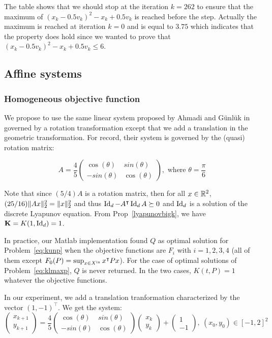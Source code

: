 \documentclass[10pt]{llncs}
\begin{document}
The table shows that we should stop at the iteration $k=262$ to ensure that the maximum of $(x_k-0.5 v_k)^2-x_k+0.5 v_k$ is reached before the step. Actually the maximum is reached at iteration $k=0$ and is equal to $3.75$ which indicates that the property does hold since we wanted to prove that
$(x_k-0.5 v_k)^2-x_k+0.5 v_k\leq 6$. 
\subsection{Affine systems}

\subsubsection{Homogeneous objective function}

We propose to use the same linear system proposed by Ahmadi and G\"unl\"uk in~\cite{ahmadi2018robust} governed by a rotation transformation except that we add a translation in the geometric transformation. For record, their system is governed by the (quasi) rotation matrix:

\[
A=
 \dfrac{4}{5}\begin{pmatrix}
 \cos(\theta)& sin(\theta)\\
-sin(\theta) & \cos(\theta)
\end{pmatrix},\text{ where }\theta=\dfrac{\pi}{6}
\]

Note that since $(5/4)A$ is a rotation matrix, then for all $x\in\mathbb R^2$,
$(25/16)\| Ax\|_2^2=\| x\|_2^2$ and thus $\operatorname{Id}_d-A^\intercal \operatorname{Id}_d A\succeq 0$ and $\operatorname{Id}_d$ is a solution of the discrete Lyapunov equation. From Prop~\ref{lyapunovbigk}, we have $\mathbf{K}=K(1,\operatorname{Id}_d)=1$. 

In practice, our Matlab implementation found $Q$ as optimal solution for Problem~\eqref{eq:kunp} when the objective functions are $F_i$ with $i=1,2,3,4$ (all of them except $F_0(P)=\sup_{x\in X^\mathrm{in}} x^\intercal P x$). For the case of optimal solutions of Problem~\eqref{eq:klmaxp}, $Q$ is never returned. In the two cases, $K(t,P)=1$ whatever the objective functions.
  
In our experiment, we add a translation tranformation characterized by the vector $(1,-1)^\intercal$. We get the system:
\begin{equation}
\label{affinesys}
\begin{pmatrix}
x_{k+1}\\
y_{k+1}
\end{pmatrix}
= \dfrac{4}{5}\begin{pmatrix}
 \cos(\theta)& sin(\theta)\\
-sin(\theta) & \cos(\theta)
\end{pmatrix}
\begin{pmatrix}
x_{k}\\
y_{k}
\end{pmatrix}+\begin{pmatrix}
1\\
-1
\end{pmatrix},\ (x_0,y_0)\in [-1,2]^2
\end{equation}
\end{document}
